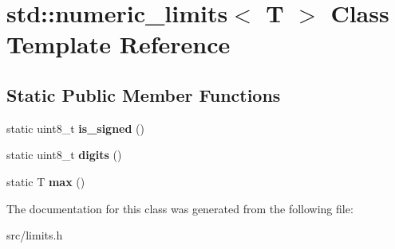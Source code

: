 \hypertarget{classstd_1_1numeric__limits}{}\section{std\+:\+:numeric\+\_\+limits$<$ T $>$ Class Template Reference}
\label{classstd_1_1numeric__limits}
\subsection*{Static Public Member Functions}
\begin{DoxyCompactItemize}
\item 
\hypertarget{classstd_1_1numeric__limits_a0c0397b435b08d7f7b629dc264ad6b39}{}\label{classstd_1_1numeric__limits_a0c0397b435b08d7f7b629dc264ad6b39} 
static uint8\+\_\+t {\bfseries is\+\_\+signed} ()
\item 
\hypertarget{classstd_1_1numeric__limits_aa7a4f181eb6e5b26661ed2c6c6ab653b}{}\label{classstd_1_1numeric__limits_aa7a4f181eb6e5b26661ed2c6c6ab653b} 
static uint8\+\_\+t {\bfseries digits} ()
\item 
\hypertarget{classstd_1_1numeric__limits_ae5fc707d9d6ebbac808a5fb6e26690f8}{}\label{classstd_1_1numeric__limits_ae5fc707d9d6ebbac808a5fb6e26690f8} 
static T {\bfseries max} ()
\end{DoxyCompactItemize}


The documentation for this class was generated from the following file\+:\begin{DoxyCompactItemize}
\item 
src/limits.\+h\end{DoxyCompactItemize}
